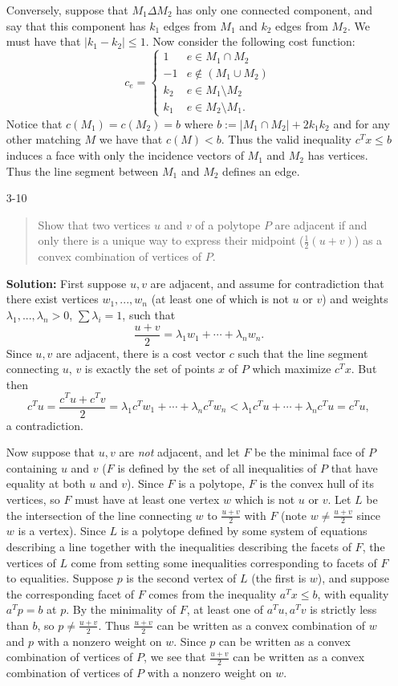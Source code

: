 \documentclass[12pt]{article}
\begin{document}
\begin{enumerate}
Conversely, suppose that $M_1\Delta M_2$ has only one connected
component, and say that this component has $k_1$ edges from $M_1$ and
$k_2$ edges from $M_2$. We must have that $|k_1-k_2|\leq 1$. Now
consider the following cost function:
$$c_e=\left\{ \begin{array}{ll} 1 & e\in M_1\cap M_2 \\ -1 & e\notin
  (M_1\cup M_2) \\ k_2 & e\in M_1\setminus M_2 \\ k_1 & e\in
  M_2\setminus M_1.\end{array}\right.$$  Notice that $c(M_1)=c(M_2)=b$
where $b:=|M_1\cap M_2| + 2 k_1k_2$ and for any other matching $M$ we
have that $c(M)<b$. Thus the valid inequality $c^Tx \leq b$ induces a
face with only the incidence vectors of $M_1$ and $M_2$ has
  vertices. Thus the line segment between $M_1$ and $M_2$ defines an
  edge.
  \fi

\item[3-10]
\begin{quote}
Show that two vertices $u$ and $v$ of a polytope $P$ are adjacent if and only there is a unique way to express their midpoint ($\frac{1}{2}(u+v)$) as a convex combination of vertices of $P$.
\end{quote}

\textbf{Solution: }First suppose $u,v$ are adjacent, and assume for contradiction that there exist vertices $w_1, ..., w_n$ (at least one of which is not $u$ or $v$) and weights $\lambda_1, ..., \lambda_n > 0$, $\sum \lambda_i = 1$, such that
\[
\frac{u+v}{2} = \lambda_1 w_1 + \cdots + \lambda_n w_n.
\]
Since $u,v$ are adjacent, there is a cost vector $c$ such that the line segment connecting $u$, $v$ is exactly the set of points $x$ of $P$ which maximize $c^Tx$. But then
\[
c^Tu = \frac{c^Tu+c^Tv}{2} = \lambda_1 c^Tw_1 + \cdots + \lambda_n c^Tw_n < \lambda_1 c^Tu + \cdots + \lambda_n c^Tu = c^Tu,
\]
a contradiction.

Now suppose that $u,v$ are \emph{not} adjacent, and let $F$ be the minimal face of $P$ containing $u$ and $v$ ($F$ is defined by the set of all inequalities of $P$ that have equality at both $u$ and $v$). Since $F$ is a polytope, $F$ is the convex hull of its vertices, so $F$ must have at least one vertex $w$ which is not $u$ or $v$. Let $L$ be the intersection of the line connecting $w$ to $\frac{u+v}{2}$ with $F$ (note $w \ne \frac{u+v}{2}$ since $w$ is a vertex). Since $L$ is a polytope defined by some system of equations describing a line together with the inequalities describing the facets of $F$, the vertices of $L$ come from setting some inequalities corresponding to facets of $F$ to equalities. Suppose $p$ is the second vertex of $L$ (the first is $w$), and suppose the corresponding facet of $F$ comes from the inequality $a^Tx \le b$, with equality $a^Tp = b$ at $p$. By the minimality of $F$, at least one of $a^Tu, a^Tv$ is strictly less than $b$, so $p \ne \frac{u+v}{2}$. Thus $\frac{u+v}{2}$ can be written as a convex combination of $w$ and $p$ with a nonzero weight on $w$. Since $p$ can be written as a convex combination of vertices of $P$, we see that $\frac{u+v}{2}$ can be written as a convex combination of vertices of $P$ with a nonzero weight on $w$.



\end{enumerate}
\end{document}
